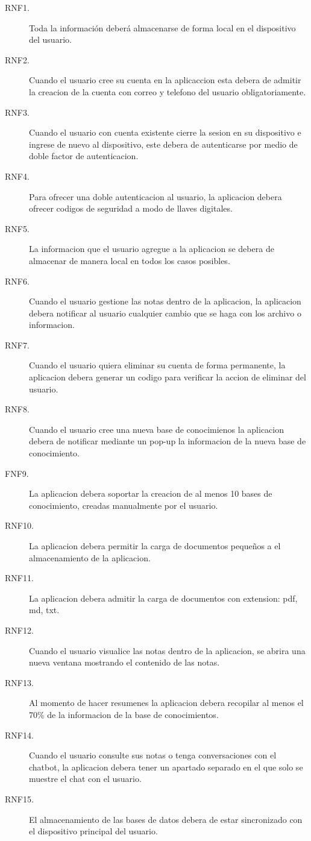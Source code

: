 \begin{description}

    \item[RNF1.] Toda la información deberá almacenarse de forma local en el dispositivo del usuario.
    \item[RNF2.] Cuando el usuario cree su cuenta en la aplicaccion esta debera de admitir la creacion de la cuenta con correo y telefono del usuario obligatoriamente.
    \item[RNF3.] Cuando el usuario con cuenta existente cierre la sesion en su dispositivo e ingrese de nuevo al dispositivo, este debera de autenticarse por medio de doble factor de autenticacion.
    \item[RNF4.] Para ofrecer una doble autenticacion al usuario, la aplicacion debera ofrecer codigos de seguridad a modo de llaves digitales.
    \item[RNF5.] La informacion que el usuario agregue a la aplicacion se debera de almacenar de manera local en todos los casos posibles.
    \item[RNF6.] Cuando el usuario gestione las notas dentro de la aplicacion, la aplicacion debera notificar al usuario cualquier cambio que se haga con los archivo o informacion.
    \item[RNF7.] Cuando el usuario quiera eliminar su cuenta de forma permanente, la aplicacion debera generar un codigo para verificar la accion de eliminar del usuario.
    \item[RNF8.] Cuando el usuario cree una nueva base de conocimienos la aplicacion debera de notificar mediante un pop-up la informacion de la nueva base de conocimiento.
    \item[FNF9.] La aplicacion debera soportar la creacion de al menos 10 bases de conocimiento, creadas manualmente por el usuario.
    \item[RNF10.] La aplicacion debera permitir la carga de documentos pequeños a el almacenamiento de la aplicacion.
    \item[RNF11.] La aplicacion debera admitir la carga de documentos con extension: pdf, md, txt.
    \item[RNF12.] Cuando el usuario visualice las notas dentro de la aplicacion, se abrira una nueva ventana mostrando el contenido de las notas.
    \item[RNF13.] Al momento de hacer resumenes la aplicacion debera recopilar al menos el 70\% de la informacion de la base de conocimientos.
    \item[RNF14.] Cuando el usuario consulte sus notas o tenga conversaciones con el chatbot, la aplicacion debera tener un apartado separado en el que solo se muestre el chat con el usuario. 
    \item[RNF15.] El almacenamiento de las bases de datos debera de estar sincronizado con el dispositivo principal del usuario. 
    

\end{description}
